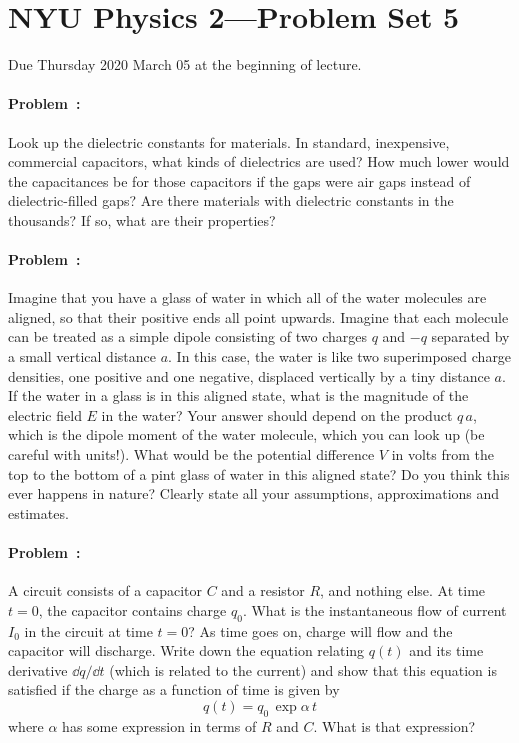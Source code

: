 \documentclass[12pt]{article}
\begin{document}
\section*{NYU Physics 2---Problem Set 5}

Due Thursday 2020 March 05 at the beginning of lecture.

\paragraph{Problem~\theproblem:}%
Look up the dielectric constants for materials.
In standard, inexpensive, commercial capacitors, what kinds of dielectrics are used?
How much lower would the capacitances be for those capacitors if the gaps were air gaps instead
of dielectric-filled gaps?
Are there materials with dielectric constants in the thousands? If so, what are their properties?

\paragraph{Problem~\theproblem:}%
Imagine that you have a glass of water in which all of the water
molecules are aligned, so that their positive ends all point upwards.
Imagine that each molecule can be treated as a simple dipole
consisting of two charges $q$ and $-q$ separated by a small vertical
distance $a$.  In this case, the water is like two superimposed charge
densities, one positive and one negative, displaced vertically by a
tiny distance $a$.  If the water in a glass is in this aligned state,
what is the magnitude of the electric field $E$ in the water?  Your
answer should depend on the product $q\,a$, which is the dipole moment
of the water molecule, which you can look up (be careful with units!).  What would
be the potential difference $V$ in volts from the top to the bottom of
a pint glass of water in this aligned state? Do you think this ever
happens in nature? Clearly state all your assumptions, approximations
and estimates.

\paragraph{Problem~\theproblem:}%
A circuit consists of a capacitor $C$ and a resistor $R$,
and nothing else.
At time $t=0$, the capacitor contains charge $q_0$.
What is the instantaneous flow of current $I_0$ in the circuit at time $t=0$?
As time goes on, charge will flow and the capacitor will discharge.
Write down the equation relating $q(t)$ and its time derivative $\dd q/\dd t$ (which
is related to the current) and show that this equation is satisfied if the charge
as a function of time is given by
\begin{equation}
q(t) = q_0\,\exp \alpha\,t
\end{equation}
where $\alpha$ has some expression in terms of $R$ and $C$. What is that expression?
\end{document}
